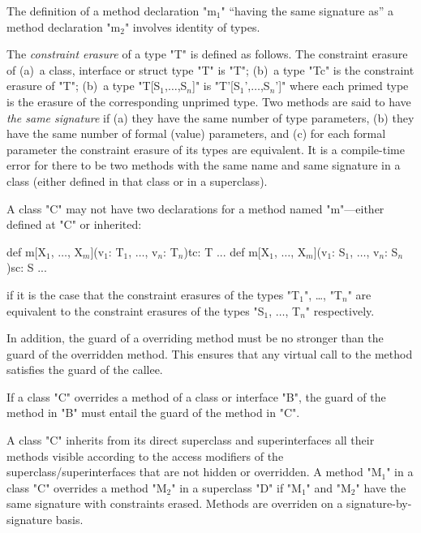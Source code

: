 The definition of a method declaration \xcdmath"m$_1$" ``having the same signature
as'' a method declaration \xcdmath"m$_2$" involves identity of types. 

The {\em constraint erasure} of a type \xcdmath"T" is defined as follows.
The constraint erasure of  (a)~a class, interface or struct type \xcdmath"T" is 
\xcdmath"T"; (b)~a type \xcdmath"T{c}" is the constraint erasure of 
\xcdmath"T"; (b)~a type \xcdmath"T[S$_1$,$\ldots$,S$_n$]" 
is \xcdmath"T'[S$_1$',$\ldots$,S$_n$']" where each primed type is the erasure of 
the corresponding unprimed type.
 Two methods are said to have {\em the
  same signature} if (a) they have the same number of type parameters,
(b) they have the same number of formal (value) parameters, and (c)
for each formal parameter the constraint erasure of its types are equivalent. It is a
compile-time error for there to be two methods with the same name and
same signature in a class (either defined in that class or in a
superclass).

\begin{staticrule*}
  A class \xcd"C" may not have two declarations for a method named \xcd"m"---either
  defined at \xcd"C" or inherited:
\begin{xtenmath}
def m[X$_1$, $\dots$, X$_m$](v$_1$: T$_1$, $\dots$, v$_n$: T$_n$){tc}: T {...}
def m[X$_1$, $\dots$, X$_m$](v$_1$: S$_1$, $\dots$, v$_n$: S$_n$){sc}: S {...}
\end{xtenmath}
\noindent
if it is the case that the constraint erasures of the types \xcdmath"T$_1$",
\dots, \xcdmath"T$_n$" are
equivalent to the constraint erasures of the types \xcdmath"S$_1$, $\dots$, T$_n$"
respectively.
\end{staticrule*}

In addition, the guard of a overriding method must be 
no stronger than the guard of the overridden method.   This
ensures that any virtual call to the method
satisfies the guard of the callee.

\begin{staticrule*}
  If a class \xcd"C" overrides a method of a class or interface
  \xcd"B", the guard of the method in \xcd"B" must entail
  the guard of the method in \xcd"C".
\end{staticrule*}

A class \xcd"C" inherits from its direct superclass and superinterfaces all
their methods visible according to the access modifiers
of the superclass/superinterfaces that are not hidden or overridden. A method \xcdmath"M$_1$" in a class
\xcd"C" overrides
a method \xcdmath"M$_2$" in a superclass \xcd"D" if
\xcdmath"M$_1$" and \xcdmath"M$_2$" have the same signature with constraints erased.
Methods are overriden on a signature-by-signature basis.


